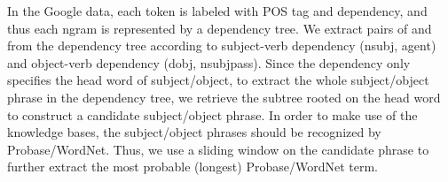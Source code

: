 
In the Google data, each token is labeled with POS tag and dependency, 
and thus each ngram is represented by a dependency tree.
We extract pairs of  and 
from the dependency tree according to subject-verb dependency (nsubj, 
agent) and object-verb dependency (dobj, nsubjpass).
Since the dependency only specifies the head word of subject/object,
to extract the whole subject/object phrase in the dependency tree, we 
retrieve the subtree rooted on the head word to construct a candidate
subject/object phrase. In order to make use of the knowledge bases, 
the subject/object phrases should be recognized by Probase/WordNet.
Thus, we use a sliding window on the candidate phrase to further 
extract the most probable (longest) Probase/WordNet term. 


